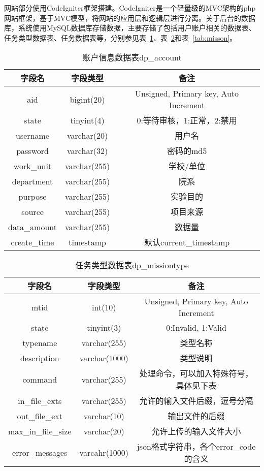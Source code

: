网站部分使用CodeIgniter框架搭建。CodeIgniter是一个轻量级的MVC架构的php网站框架，基于MVC模型，将网站的应用层和逻辑层进行分离\cite{burbeck87}。关于后台的数据库，系统使用MySQL数据库存储数据，主要存储了包括用户账户相关的数据表、任务类型数据表、任务数据表等，分别参见表~\ref{tab:account}、表~\ref{tab:mission_type}和表~\ref{tab:misson}。

\begin{table}
\centering
\caption{账户信息数据表dp\_account}
\label{tab:account}
\begin{tabular}{ccc}
\toprule[1.5pt]
字段名 & 字段类型 & 备注 \\ \midrule[1pt]
aid & bigint(20) & Unsigned, Primary key, Auto Increment \\
state & tinyint(4) & 0:等待审核，1:正常，2:禁用 \\
username & varchar(20) & 用户名 \\
password & varchar(32) & 密码的md5 \\
work\_unit & varchar(255) & 学校/单位 \\
department & varchar(255) & 院系 \\
purpose & varchar(255) & 实验目的 \\
source & varchar(255) & 项目来源 \\
data\_amount & varchar(255) & 数据量 \\
create\_time & timestamp & 默认current\_timestamp \\ \bottomrule[1.5pt]
\end{tabular}
\end{table}

\begin{table}
\centering
\caption{任务类型数据表dp\_missiontype}
\label{tab:mission_type}
\begin{tabular}{ccc}
\toprule[1.5pt]
字段名 & 字段类型 & 备注 \\ \midrule[1pt]
mtid & int(10) & Unsigned, Primary key, Auto Increment \\
state & tinyint(3) & 0:Invalid, 1:Valid \\
typename & varchar(255) & 类型名称 \\
description & varchar(1000) & 类型说明 \\
command & varchar(255) & 处理命令，可以加入特殊符号，具体见下表 \\
in\_file\_exts & varchar(255) & 允许的输入文件后缀，逗号分隔 \\
out\_file\_ext & varchar(10) & 输出文件的后缀 \\
max\_in\_file\_size & varchar(20) & 允许上传的输入文件大小 \\
error\_messages & varcahr(1000) & json格式字符串，各个error\_code的含义 \\ \bottomrule[1.5pt]
\end{tabular}
\end{table}

